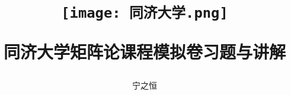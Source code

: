 \def\myTitle{同济大学矩阵论课程模拟卷习题与讲解}
\def\myAuthor{宁之恒}
% 


\title{
    \begin{figure}[!h]
        \centering
        \texttt{[image: 同济大学.png]}
        \label{同济大学}
    \end{figure}

    {\Huge{\textbf{\myTitle}}}}
\author{\myAuthor}
\date{}
\maketitle




